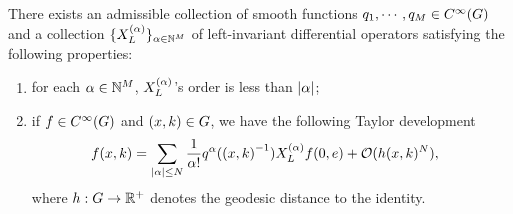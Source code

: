 \begin{proposition}
    There exists an admissible collection of smooth functions $q_1, \cdots, q_M \in {C^\infty(G)}$
    and a collection $\{X^{(\alpha)}_L\}_{\alpha \in \mathbb{N}^M}$ of left-invariant differential operators satisfying the following properties:
    \begin{enumerate}
        \item for each $\alpha \in \mathbb{N}^M$, $X^{(\alpha)}_L$'s order is less than $\left|{\alpha}\right|$;
        \item if $f \in {C^\infty(G)}$ and $(x, k) \in G$,
            we have the following Taylor development
            \begin{align*}
                f(x, k) &= \sum_{\left|{\alpha}\right| \leq N} \frac{1}{\alpha!} q^\alpha({(x, k)}^{-1}) X^{(\alpha)}_L f(0, e) + \mathcal{O}(h(x, k)^N),
            \end{align*}
            where $h : G \to \mathbb{R}^+$ denotes the geodesic distance to the identity.
    \end{enumerate}
\end{proposition}
